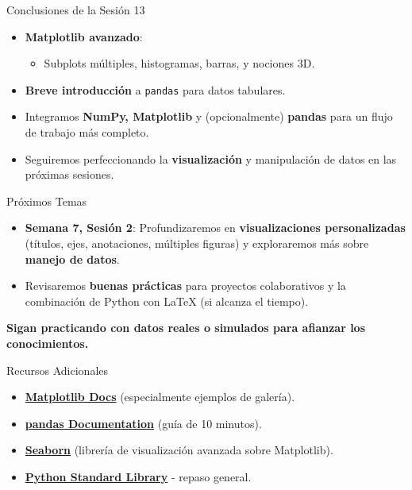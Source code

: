 \documentclass[10pt]{beamer}
\begin{document}
\begin{frame}{Conclusiones de la Sesión 13}
  \begin{itemize}
    \item \textbf{Matplotlib avanzado}:
      \begin{itemize}
        \item Subplots múltiples, histogramas, barras, y nociones 3D.
      \end{itemize}
    \item \textbf{Breve introducción} a \texttt{pandas} para datos tabulares.
    \item Integramos \textbf{NumPy, Matplotlib} y (opcionalmente) \textbf{pandas} para un flujo de trabajo más completo.
    \item Seguiremos perfeccionando la \textbf{visualización} y manipulación de datos en las próximas sesiones.
  \end{itemize}
\end{frame}

\begin{frame}{Próximos Temas}
  \begin{itemize}
    \item \textbf{Semana 7, Sesión 2}: Profundizaremos en \textbf{visualizaciones personalizadas} (títulos, ejes, anotaciones, múltiples figuras) y exploraremos más sobre \textbf{manejo de datos}.
    \item Revisaremos \textbf{buenas prácticas} para proyectos colaborativos y la combinación de Python con LaTeX (si alcanza el tiempo).
  \end{itemize}
  \vspace{0.3cm}
  \textbf{Sigan practicando con datos reales o simulados para afianzar los conocimientos.}
\end{frame}

\begin{frame}{Recursos Adicionales}
  \begin{itemize}
    \item \href{https://matplotlib.org/stable/}{\textbf{Matplotlib Docs}} (especialmente ejemplos de galería).
    \item \href{https://pandas.pydata.org/}{\textbf{pandas Documentation}} (guía de 10 minutos).
    \item \href{https://seaborn.pydata.org/}{\textbf{Seaborn}} (librería de visualización avanzada sobre Matplotlib).
    \item \href{https://docs.python.org/3/library/}{\textbf{Python Standard Library}} - repaso general.
  \end{itemize}
\end{frame}
\end{document}
